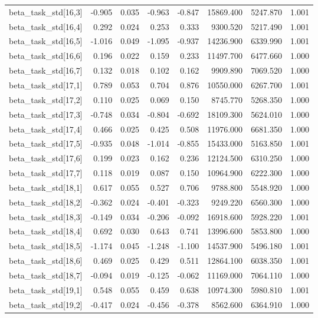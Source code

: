 \begin{tabular}{lrrrrrrr}
beta\_task\_std[16,3] & -0.905 & 0.035 & -0.963 & -0.847 & 15869.400 & 5247.870 & 1.001 \\
beta\_task\_std[16,4] & 0.292 & 0.024 & 0.253 & 0.333 & 9300.520 & 5217.490 & 1.001 \\
beta\_task\_std[16,5] & -1.016 & 0.049 & -1.095 & -0.937 & 14236.900 & 6339.990 & 1.001 \\
beta\_task\_std[16,6] & 0.196 & 0.022 & 0.159 & 0.233 & 11497.700 & 6477.660 & 1.000 \\
beta\_task\_std[16,7] & 0.132 & 0.018 & 0.102 & 0.162 & 9909.890 & 7069.520 & 1.000 \\
beta\_task\_std[17,1] & 0.789 & 0.053 & 0.704 & 0.876 & 10550.000 & 6267.700 & 1.001 \\
beta\_task\_std[17,2] & 0.110 & 0.025 & 0.069 & 0.150 & 8745.770 & 5268.350 & 1.000 \\
beta\_task\_std[17,3] & -0.748 & 0.034 & -0.804 & -0.692 & 18109.300 & 5624.010 & 1.000 \\
beta\_task\_std[17,4] & 0.466 & 0.025 & 0.425 & 0.508 & 11976.000 & 6681.350 & 1.000 \\
beta\_task\_std[17,5] & -0.935 & 0.048 & -1.014 & -0.855 & 15433.000 & 5163.850 & 1.001 \\
beta\_task\_std[17,6] & 0.199 & 0.023 & 0.162 & 0.236 & 12124.500 & 6310.250 & 1.000 \\
beta\_task\_std[17,7] & 0.118 & 0.019 & 0.087 & 0.150 & 10964.900 & 6222.300 & 1.000 \\
beta\_task\_std[18,1] & 0.617 & 0.055 & 0.527 & 0.706 & 9788.800 & 5548.920 & 1.000 \\
beta\_task\_std[18,2] & -0.362 & 0.024 & -0.401 & -0.323 & 9249.220 & 6560.300 & 1.000 \\
beta\_task\_std[18,3] & -0.149 & 0.034 & -0.206 & -0.092 & 16918.600 & 5928.220 & 1.001 \\
beta\_task\_std[18,4] & 0.692 & 0.030 & 0.643 & 0.741 & 13996.600 & 5853.800 & 1.000 \\
beta\_task\_std[18,5] & -1.174 & 0.045 & -1.248 & -1.100 & 14537.900 & 5496.180 & 1.001 \\
beta\_task\_std[18,6] & 0.469 & 0.025 & 0.429 & 0.511 & 12864.100 & 6038.350 & 1.001 \\
beta\_task\_std[18,7] & -0.094 & 0.019 & -0.125 & -0.062 & 11169.000 & 7064.110 & 1.000 \\
beta\_task\_std[19,1] & 0.548 & 0.055 & 0.459 & 0.638 & 10974.300 & 5980.810 & 1.001 \\
beta\_task\_std[19,2] & -0.417 & 0.024 & -0.456 & -0.378 & 8562.600 & 6364.910 & 1.000 \\

\end{tabular}
